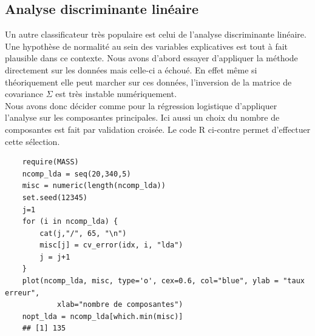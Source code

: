 \documentclass[12pt,a4paper]{article}
\begin{document}
\subsection{Analyse discriminante linéaire}
Un autre classificateur très populaire est celui de l'analyse discriminante linéaire. Une hypothèse de normalité au sein des variables explicatives est tout à fait plausible dans ce contexte. Nous avons d'abord essayer d'appliquer la méthode directement sur les données mais celle-ci a échoué. En effet même si théoriquement elle peut marcher sur ces données, l'inversion de la matrice de covariance $\Sigma$ est très instable numériquement.\\
Nous avons donc décider comme pour la régression logistique d'appliquer l'analyse sur les composantes principales. Ici aussi un choix du nombre de composantes est fait par validation croisée. Le code R ci-contre permet d'effectuer cette sélection.\vspace{2mm}
\begin{lstlisting}
	require(MASS)
	ncomp_lda = seq(20,340,5)
	misc = numeric(length(ncomp_lda))
	set.seed(12345)
	j=1
	for (i in ncomp_lda) {
		cat(j,"/", 65, "\n")
		misc[j] = cv_error(idx, i, "lda")
		j = j+1
	}
	plot(ncomp_lda, misc, type='o', cex=0.6, col="blue", ylab = "taux erreur",
			xlab="nombre de composantes")
	nopt_lda = ncomp_lda[which.min(misc)]
	## [1] 135
\end{lstlisting}
\end{document}
